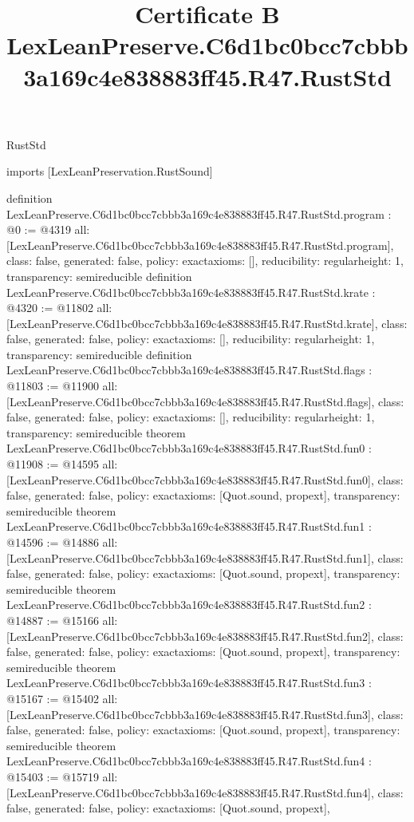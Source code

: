 \begin{lexlean}{RustStd}
\title{Certificate B LexLeanPreserve.C6d1bc0bcc7cbbb3a169c4e838883ff45.R47.RustStd}
\begin{coremodule}
imports [LexLeanPreservation.RustSound]

definition LexLeanPreserve.C6d1bc0bcc7cbbb3a169c4e838883ff45.R47.RustStd.program : @0 := @4319 {
  all: [LexLeanPreserve.C6d1bc0bcc7cbbb3a169c4e838883ff45.R47.RustStd.program],
  class: false,
  generated: false,
  policy: exact{axioms: []},
  reducibility: regular{height: 1},
  transparency: semireducible
}
definition LexLeanPreserve.C6d1bc0bcc7cbbb3a169c4e838883ff45.R47.RustStd.krate : @4320 := @11802 {
  all: [LexLeanPreserve.C6d1bc0bcc7cbbb3a169c4e838883ff45.R47.RustStd.krate],
  class: false,
  generated: false,
  policy: exact{axioms: []},
  reducibility: regular{height: 1},
  transparency: semireducible
}
definition LexLeanPreserve.C6d1bc0bcc7cbbb3a169c4e838883ff45.R47.RustStd.flags : @11803 := @11900 {
  all: [LexLeanPreserve.C6d1bc0bcc7cbbb3a169c4e838883ff45.R47.RustStd.flags],
  class: false,
  generated: false,
  policy: exact{axioms: []},
  reducibility: regular{height: 1},
  transparency: semireducible
}
theorem LexLeanPreserve.C6d1bc0bcc7cbbb3a169c4e838883ff45.R47.RustStd.fun0 : @11908 := @14595 {
  all: [LexLeanPreserve.C6d1bc0bcc7cbbb3a169c4e838883ff45.R47.RustStd.fun0],
  class: false,
  generated: false,
  policy: exact{axioms: [Quot.sound, propext]},
  transparency: semireducible
}
theorem LexLeanPreserve.C6d1bc0bcc7cbbb3a169c4e838883ff45.R47.RustStd.fun1 : @14596 := @14886 {
  all: [LexLeanPreserve.C6d1bc0bcc7cbbb3a169c4e838883ff45.R47.RustStd.fun1],
  class: false,
  generated: false,
  policy: exact{axioms: [Quot.sound, propext]},
  transparency: semireducible
}
theorem LexLeanPreserve.C6d1bc0bcc7cbbb3a169c4e838883ff45.R47.RustStd.fun2 : @14887 := @15166 {
  all: [LexLeanPreserve.C6d1bc0bcc7cbbb3a169c4e838883ff45.R47.RustStd.fun2],
  class: false,
  generated: false,
  policy: exact{axioms: [Quot.sound, propext]},
  transparency: semireducible
}
theorem LexLeanPreserve.C6d1bc0bcc7cbbb3a169c4e838883ff45.R47.RustStd.fun3 : @15167 := @15402 {
  all: [LexLeanPreserve.C6d1bc0bcc7cbbb3a169c4e838883ff45.R47.RustStd.fun3],
  class: false,
  generated: false,
  policy: exact{axioms: [Quot.sound, propext]},
  transparency: semireducible
}
theorem LexLeanPreserve.C6d1bc0bcc7cbbb3a169c4e838883ff45.R47.RustStd.fun4 : @15403 := @15719 {
  all: [LexLeanPreserve.C6d1bc0bcc7cbbb3a169c4e838883ff45.R47.RustStd.fun4],
  class: false,
  generated: false,
  policy: exact{axioms: [Quot.sound, propext]},
}
\end{coremodule}
\end{lexlean}
